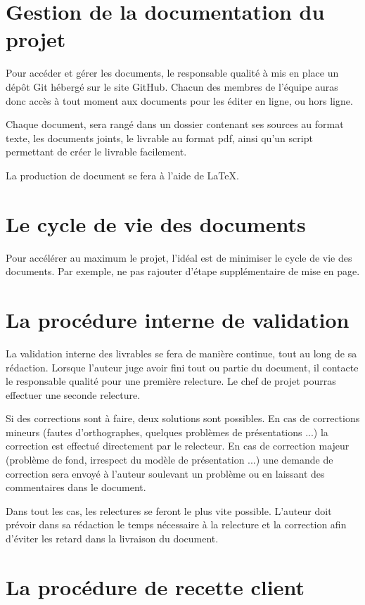 \section{Gestion de la documentation du projet}

Pour accéder et gérer les documents, le responsable qualité à mis en place un dépôt Git hébergé sur le site GitHub.
Chacun des membres de l’équipe auras donc accès à tout moment aux documents pour les éditer en ligne, ou hors ligne.


Chaque document, sera rangé dans un dossier contenant ses sources au format texte, les documents joints, le livrable au format pdf, ainsi qu'un script permettant de créer le livrable facilement.

La production de document se fera à l’aide de LaTeX.

\section{Le cycle de vie des documents}

Pour accélérer au maximum le projet, l’idéal est de minimiser le cycle de vie des documents.
Par exemple, ne pas rajouter d’étape supplémentaire de mise en page.

\section{La procédure interne de validation}

La validation interne des livrables se fera de manière continue, tout au long de sa rédaction.
Lorsque l’auteur juge avoir fini tout ou partie du document, il contacte le responsable qualité pour une première relecture. Le chef de projet pourras effectuer une seconde relecture.

Si des corrections sont à faire, deux solutions sont possibles.
En cas de corrections mineurs (fautes d’orthographes, quelques problèmes de présentations ...) la correction est effectué directement par le relecteur.
En cas de correction majeur (problème de fond, irrespect du modèle de présentation ...) une demande de correction sera envoyé à l’auteur soulevant un problème ou en laissant des commentaires dans le document.

Dans tout les cas, les relectures se feront le plus vite possible.
L’auteur doit prévoir dans sa rédaction le temps nécessaire à la relecture et la correction afin d’éviter les retard dans la livraison du document.

\section{La procédure de recette client}

